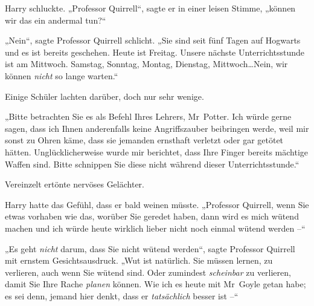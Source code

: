 Harry schluckte. „Professor Quirrell“, sagte er in einer leisen Stimme, „können wir das ein andermal tun?“

„Nein“, sagte Professor Quirrell schlicht. „Sie sind seit fünf Tagen auf Hogwarts und es ist bereits geschehen. Heute ist Freitag. Unsere nächste Unterrichtsstunde ist am Mittwoch. Samstag, Sonntag, Montag, Dienstag, Mittwoch…Nein, wir können \emph{nicht} so lange warten.“

Einige Schüler lachten darüber, doch nur sehr wenige.

„Bitte betrachten Sie es als Befehl Ihres Lehrers, Mr~Potter. Ich würde gerne sagen, dass ich Ihnen anderenfalls keine Angriffszauber beibringen werde, weil mir sonst zu Ohren käme, dass sie jemanden ernsthaft verletzt oder gar getötet hätten. Unglücklicherweise wurde mir berichtet, dass Ihre Finger bereits mächtige Waffen sind. Bitte schnippen Sie diese nicht während dieser Unterrichtsstunde.“

Vereinzelt ertönte nervöses Gelächter.

Harry hatte das Gefühl, dass er bald weinen müsste. „Professor Quirrell, wenn Sie etwas vorhaben wie das, worüber Sie geredet haben, dann wird es mich wütend machen und ich würde heute wirklich lieber nicht noch einmal wütend werden –“

„Es geht \emph{nicht} darum, dass Sie nicht wütend werden“, sagte Professor Quirrell mit ernstem Gesichtsausdruck. „Wut ist natürlich. Sie müssen lernen, zu verlieren, auch wenn Sie wütend sind. Oder zumindest \emph{scheinbar} zu verlieren, damit Sie Ihre Rache \emph{planen} können. Wie ich es heute mit Mr~Goyle getan habe; es sei denn, jemand hier denkt, dass er \emph{tatsächlich} besser ist –“

